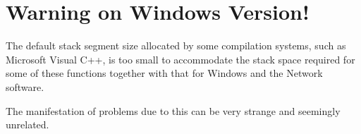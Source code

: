 \chapter{Warning on Windows Version!}
\label{chp:warning-on-windows-version}
The default stack segment size allocated by some compilation systems,
such as Microsoft Visual C++, is too small to accommodate the stack
space required for some of these functions together with that for
Windows and the Network software.

The manifestation of problems due to this can be very strange and
seemingly unrelated.

